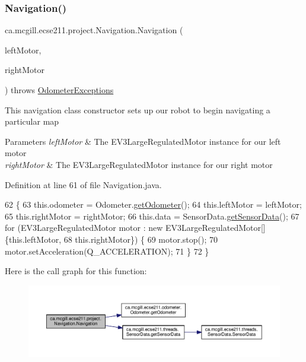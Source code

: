 \subsubsection{\texorpdfstring{Navigation()}{Navigation()}}
{\footnotesize\ttfamily ca.\+mcgill.\+ecse211.\+project.\+Navigation.\+Navigation (\begin{DoxyParamCaption}\item[{E\+V3\+Large\+Regulated\+Motor}]{left\+Motor,  }\item[{E\+V3\+Large\+Regulated\+Motor}]{right\+Motor }\end{DoxyParamCaption}) throws \hyperlink{classca_1_1mcgill_1_1ecse211_1_1odometer_1_1_odometer_exceptions}{Odometer\+Exceptions}}

This navigation class constructor sets up our robot to begin navigating a particular map


\begin{DoxyParams}{Parameters}
{\em left\+Motor} & The E\+V3\+Large\+Regulated\+Motor instance for our left motor \\
\hline
{\em right\+Motor} & The E\+V3\+Large\+Regulated\+Motor instance for our right motor \\
\hline
\end{DoxyParams}


Definition at line 61 of file Navigation.\+java.


\begin{DoxyCode}
62                                 \{
63     this.odometer = Odometer.\hyperlink{classca_1_1mcgill_1_1ecse211_1_1odometer_1_1_odometer_a99171f11e34dea918fa9dd069d721439}{getOdometer}();
64     this.leftMotor = leftMotor;
65     this.rightMotor = rightMotor;
66     this.data = SensorData.\hyperlink{classca_1_1mcgill_1_1ecse211_1_1threads_1_1_sensor_data_a8260aba53b4474ca1275e4ce26157977}{getSensorData}();
67     \textcolor{keywordflow}{for} (EV3LargeRegulatedMotor motor : \textcolor{keyword}{new} EV3LargeRegulatedMotor[] \{this.leftMotor,
68         this.rightMotor\}) \{
69       motor.stop();
70       motor.setAcceleration(Q\_ACCELERATION);
71     \}
72   \}
\end{DoxyCode}
Here is the call graph for this function\+:\nopagebreak
\begin{figure}[H]
\begin{center}
\leavevmode
\includegraphics[width=350pt]{classca_1_1mcgill_1_1ecse211_1_1project_1_1_navigation_aaee14b67c392ddd951e3ce21224c3e56_cgraph}
\end{center}
\end{figure}


